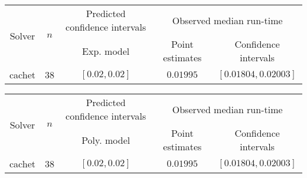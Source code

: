 \begin{tabular}{ccccc}
\hline 
\multirow{2}{*}{Solver} & \multirow{2}{*}{$n$} & Predicted confidence intervals & \multicolumn{2}{c}{Observed median  run-time}\tabularnewline
 &  & Exp. model  & Point estimates  & Confidence intervals\tabularnewline
\hline 
\hline 
\multirow{0}{*}{cachet} & 38 & $\mathbf{\left[0.02,0.02\right]}$ & $0.01995$ & $\left[0.01804,0.02003\right]$ \tabularnewline 
\hline 
\end{tabular} 

\begin{tabular}{ccccc}
\hline 
\multirow{2}{*}{Solver} & \multirow{2}{*}{$n$} & Predicted confidence intervals & \multicolumn{2}{c}{Observed median  run-time}\tabularnewline
 &  & Poly. model  & Point estimates  & Confidence intervals\tabularnewline
\hline 
\hline 
\multirow{0}{*}{cachet} & 38 & $\mathbf{\left[0.02,0.02\right]}$ & $0.01995$ & $\left[0.01804,0.02003\right]$ \tabularnewline 
\hline 
\end{tabular} 


